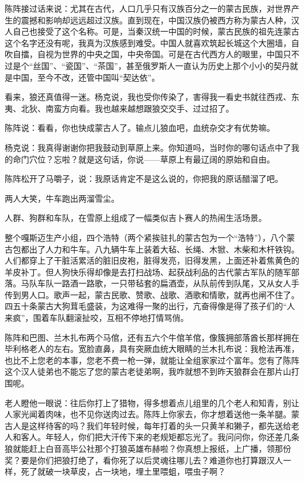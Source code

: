 \par 陈阵接过话来说：尤其在古代，人口几乎只有汉族百分之一的蒙古民族，对世界产生的震撼和影响却远远超过汉族。直到现在，中国汉族仍被西方称为蒙古人种，汉人自己也接受了这个名称。可是，当秦汉统一中国的时候，蒙古民族的祖先连蒙古这个名字还没有呢，我真为汉族感到难受。中国人就喜欢筑起长城这个大圈墙，自吹自擂，自视为世界的中央之国，中央帝国。可是在古代西方人的眼里，中国只不过是个“丝国”、“瓷国”、“茶国”，甚至俄罗斯人一直认为历史上那个小小的契丹就是中国，至今不改，还管中国叫“契达依”。
\par 看来，狼还真值得一迷。杨克说，我也受你传染了，害得我一看史书就往西戎、东夷、北狄、南蛮方向看。我也越来越想跟狼交交手、过过招了。
\par 陈阵说：看看，你也快成蒙古人了。输点儿狼血吧，血统杂交才有优势嘛。
\par 杨克说：我真得谢谢你把我鼓动到草原上来。你知道吗，当时你的哪句话点中了我的命门穴位？忘啦？就是这句话，你说——草原上有最辽阔的原始和自由。
\par 陈阵松开了马嚼子，说：我原话肯定不是这么说的，你把我的原话醋溜了吧。
\par 两人大笑，牛车跑出两溜雪尘。
\par 
\par 人群、狗群和车队，在雪原上组成了一幅类似吉卜赛人的热闹生活场景。
\par 整个嘎斯迈生产小组，四个浩特（两个紧挨驻扎的蒙古包为一个“浩特”），八个蒙古包都出了人力和牛车。八九辆牛车上装着大毡、长绳、木锨、木柴和木杆铁钩。人们都穿上了干脏活累活的脏旧皮袍，脏得发亮，旧得发黑，上面还补着焦黄色的羊皮补丁。但人狗快乐得却像是去打扫战场、起获战利品的古代蒙古军队的随军部落。马队车队一路酒一路歌，一只带毡套的扁酒壶，从队前传到队尾，又从女人手传到男人口。歌声一起，蒙古民歌、赞歌、战歌、酒歌和情歌，就再也闸不住了。四五十条蒙古大狗茸毛盛装，为这难得一聚的出行，亢奋得像是得了孩子们的“人来疯”，围着车队翻滚扯咬，互相不停地打情骂俏。
\par 陈阵和巴图、兰木扎布两个马倌，还有五六个牛倌羊倌，像簇拥部落酋长那样拥在毕利格老人的左右。宽脸直鼻，具有突厥血统大眼睛的兰木扎布说：我枪法再准，也比不上您老的本事，您老不费一枪一弹，就能让全组家家过个富年。您有了陈阵这个汉人徒弟也不能忘了您的蒙古老徒弟啊，我咋就想不到昨天狼群会在那片山打围呢。
\par 老人瞪他一眼说：往后你打上了猎物，得多想着点儿组里的几个老人和知青，别让人家光闻着肉味，也不见你送肉过去。陈阵上你家去，你才想着送他一条羊腿。蒙古人是这样待客的吗？我们年轻时候，每年打着的头一只黄羊和獭子，都先送给老人和客人。年轻人，你们把大汗传下来的老规矩都忘光了。我问问你，你还差几条狼就能赶上白音高毕公社那个打狼英雄布赫啦？你真想上报纸，上广播，领那份奖？要是你们把狼打绝了，看你死了以后灵魂往哪儿去？难道你也打算跟汉人一样，死了就破一块草皮，占一块地，埋土里喂蛆，喂虫子啊？
